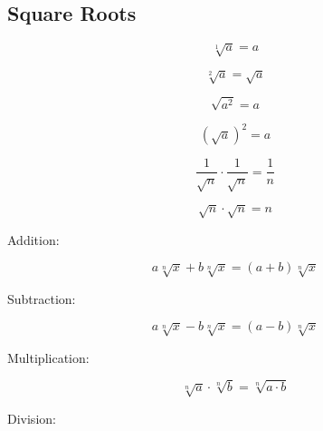 \vspace{0.5cm}\subsection{Square Roots}
\vspace{0.5cm}\begin{definition}\label{def-square-roots}

    \begin{equation}
        \sqrt[1]{a} = a \label{eq-33}
    \end{equation}

    \begin{equation}
        \sqrt[2]{a} = \sqrt{a} \label{eq-34}
    \end{equation}

    \begin{equation}
        \sqrt{a^2} = a \label{eq-35}
    \end{equation}

    \begin{equation}
        \left(\sqrt{a}\right)^2 = a \label{eq-36}
    \end{equation}
    
    \begin{equation}
        \frac{1}{\sqrt{n}} \cdot \frac{1}{\sqrt{n}} = \frac{1}{n} \label{eq-37}
    \end{equation}

    \begin{equation}
        \sqrt{n} \cdot \sqrt{n} = n \label{eq-38}
    \end{equation}

    \flushleft \normalfont Addition: 

    \begin{equation}
        a\sqrt[n]{x} + b\sqrt[n]{x} = (a+b)\sqrt[n]{x} \label{eq-39}
    \end{equation}

    Subtraction: 

    \begin{equation}
        a\sqrt[n]{x} - b\sqrt[n]{x} = (a-b)\sqrt[n]{x} \label{eq-40}
    \end{equation}

    Multiplication: 

    \begin{equation}
        \sqrt[n]{a} \cdot \sqrt[n]{b} = \sqrt[n]{a \cdot b} \label{eq-41}
    \end{equation}

    Division: 


\end{definition}

